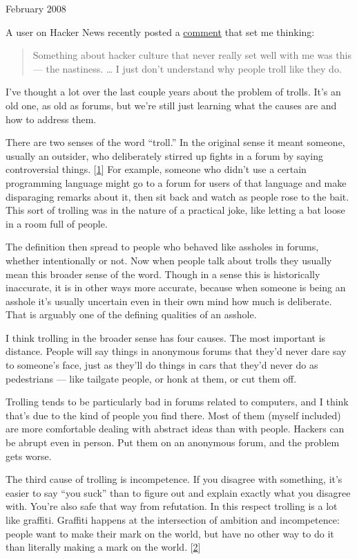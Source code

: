 February 2008

A user on Hacker News recently posted a
\href{http://news.ycombinator.com/item?id=116938}{comment} that set me
thinking:

\begin{quote}
Something about hacker culture that never really set well with me was
this --- the nastiness. \ldots{} I just don't understand why people
troll like they do.
\end{quote}

I've thought a lot over the last couple years about the problem of
trolls. It's an old one, as old as forums, but we're still just learning
what the causes are and how to address them.

There are two senses of the word ``troll.'' In the original sense it
meant someone, usually an outsider, who deliberately stirred up fights
in a forum by saying controversial things. {[}\hyperref[f1n]{1}{]} For
example, someone who didn't use a certain programming language might go
to a forum for users of that language and make disparaging remarks about
it, then sit back and watch as people rose to the bait. This sort of
trolling was in the nature of a practical joke, like letting a bat loose
in a room full of people.

The definition then spread to people who behaved like assholes in
forums, whether intentionally or not. Now when people talk about trolls
they usually mean this broader sense of the word. Though in a sense this
is historically inaccurate, it is in other ways more accurate, because
when someone is being an asshole it's usually uncertain even in their
own mind how much is deliberate. That is arguably one of the defining
qualities of an asshole.

I think trolling in the broader sense has four causes. The most
important is distance. People will say things in anonymous forums that
they'd never dare say to someone's face, just as they'll do things in
cars that they'd never do as pedestrians --- like tailgate people, or
honk at them, or cut them off.

Trolling tends to be particularly bad in forums related to computers,
and I think that's due to the kind of people you find there. Most of
them (myself included) are more comfortable dealing with abstract ideas
than with people. Hackers can be abrupt even in person. Put them on an
anonymous forum, and the problem gets worse.

The third cause of trolling is incompetence. If you disagree with
something, it's easier to say ``you suck'' than to figure out and
explain exactly what you disagree with. You're also safe that way from
refutation. In this respect trolling is a lot like graffiti. Graffiti
happens at the intersection of ambition and incompetence: people want to
make their mark on the world, but have no other way to do it than
literally making a mark on the world. {[}\hyperref[f2n]{2}{]}

